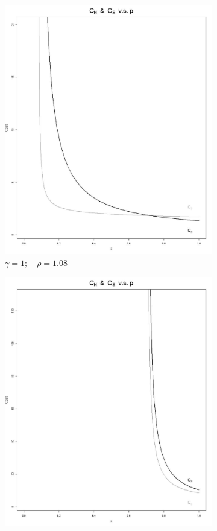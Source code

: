 \documentclass[11pt]{article}
\numberwithin{equation}{section}
\begin{document}
\begin{figure}[h!]
	\begin{subfigure}[b]{0.49\textwidth}
	\includegraphics[width=\textwidth]{plots/cost_vs_p_1_1_08.png}
		\caption{$\gamma=1;\quad\rho=1.08$}
		\label{cost_vs_p_1_1_08}
	\end{subfigure}
	\begin{subfigure}[b]{0.49\textwidth}
	\includegraphics[width=\textwidth]{plots/cost_vs_p_1_1_515.png}

\end{subfigure}
\end{figure}
\end{document}
